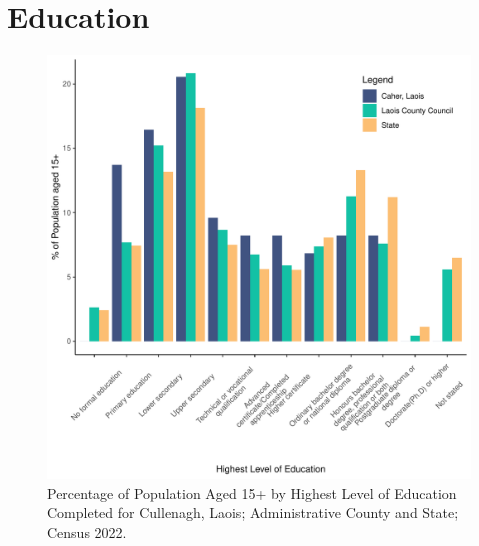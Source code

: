 \documentclass{article}
\begin{document}
\section{Education}\label{sect:Edu}
\begin{figure}[H]
	\centering
	\includegraphics[width = 120mm]{../figures/EduED.pdf}
	\caption{Percentage of Population Aged 15+ by Highest Level of Education Completed for Cullenagh, Laois; Administrative County and State; Census 2022.}
	\label{fig:vbnv}
	\end{figure}
\end{document}
